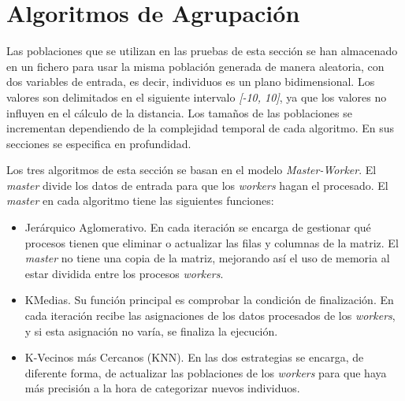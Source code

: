 		
			
			
	


\section{Algoritmos de Agrupación}

	Las poblaciones que se utilizan en las pruebas de esta sección se han almacenado en un fichero para usar la misma población generada de manera aleatoria, con dos variables de entrada, es decir, individuos es un plano bidimensional. Los valores son delimitados en el siguiente intervalo \textit{[-10, 10]}, ya que los valores no influyen en el cálculo de la distancia. Los tamaños de las poblaciones se incrementan dependiendo de la complejidad temporal de cada algoritmo. En sus secciones se especifica en profundidad.	
	
	Los tres algoritmos de esta sección se basan en el modelo \textit{Master-Worker}. El \textit{master} divide los datos de entrada para que los \textit{workers} hagan el procesado. El \textit{master} en cada algoritmo tiene las siguientes funciones:	
	
	\begin{itemize}
		\item Jerárquico Aglomerativo. En cada iteración se encarga de gestionar qué procesos tienen que eliminar o actualizar las filas y columnas de la matriz. El \textit{master} no tiene una copia de la matriz, mejorando así el uso de memoria al estar dividida entre los procesos \textit{workers}.
		\item KMedias. Su función principal es comprobar la condición de finalización. En cada iteración recibe las asignaciones de los datos procesados de los \textit{workers}, y si esta asignación no varía, se finaliza la ejecución.
		\item K-Vecinos más Cercanos (KNN). En las dos estrategias se encarga, de diferente forma, de actualizar las poblaciones de los \textit{workers} para que haya más precisión a la hora de categorizar nuevos individuos.
	\end{itemize} 

	
